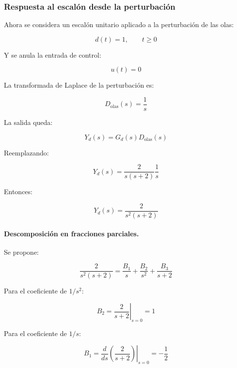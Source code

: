 \documentclass[12pt,a4paper]{article}
\begin{document}
\subsubsection*{Respuesta al escalón desde la perturbación}
Ahora se considera un escalón unitario aplicado a la perturbación de las olas:

\begin{equation}d(t)=1,\qquad t\geq0\end{equation}

Y se anula la entrada de control:

\begin{equation}u(t)=0\end{equation}

La transformada de Laplace de la perturbación es:

\begin{equation}D_{\mathrm{olas}}(s)=\frac{1}{s}\end{equation}

La salida queda:

\begin{equation}Y_d(s)=G_d(s)D_{\mathrm{olas}}(s)\end{equation}

Reemplazando:

\begin{equation}Y_d(s)=\frac{2}{s(s+2)} \frac{1}{s}\end{equation}

Entonces:

\begin{equation}\boxed{Y_d(s)=\frac{2}{s^2(s+2)}}\end{equation}
\paragraph{Descomposición en fracciones parciales.} Se propone:

\begin{equation}\frac{2}{s^2(s+2)}=\frac{B_1}{s}+\frac{B_2}{s^2}+\frac{B_3}{s+2}\end{equation}

Para el coeficiente de $1/s^2$:

\begin{equation}B_2=\left. \frac{2}{s+2} \right|_{s=0}=1\end{equation}

Para el coeficiente de $1/s$:

\begin{equation}B_1=\left. \frac{d}{ds} \left(\frac{2}{s+2}\right) \right|_{s=0}=-\frac{1}{2}\end{equation}
\end{document}
